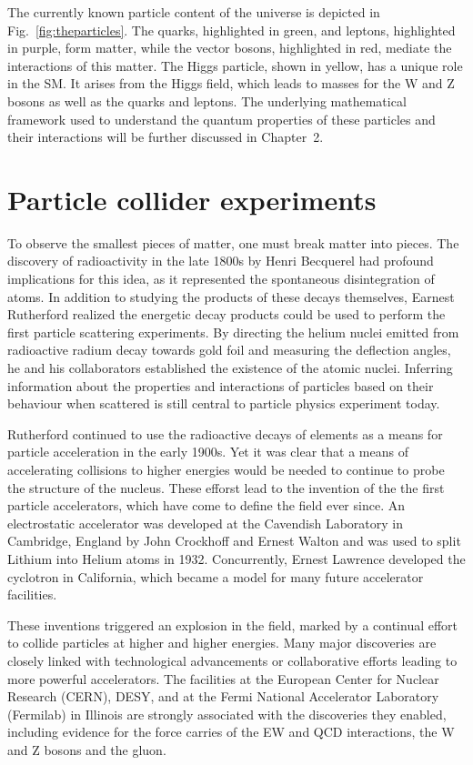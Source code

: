 The currently known particle content of the universe is depicted in Fig.~\ref{fig:theparticles}.
The quarks, highlighted in green, and leptons, highlighted in purple,
form matter, while the vector bosons, highlighted in red, mediate the 
interactions of this matter. The Higgs particle, shown in yellow,
has a unique role in the SM. It arises from the Higgs field, which
leads to masses for the W and Z bosons as well as the quarks and leptons.
The underlying mathematical framework used to understand the quantum 
properties of these particles and their interactions will be further discussed
in Chapter~2. 

\section{Particle collider experiments}

To observe the smallest pieces of matter, one must break matter into pieces.
The discovery of radioactivity in the late 1800s by Henri Becquerel had
profound implications for this idea, as it represented the spontaneous
disintegration of atoms. 
In addition to studying the products of these decays themselves, 
Earnest Rutherford realized the energetic decay products could be used
to perform the first particle scattering experiments. By directing the 
helium nuclei emitted from radioactive radium decay towards gold foil
and measuring the deflection
angles, he and his collaborators established the existence of the atomic nuclei.
Inferring information about the properties and interactions of particles based on their
behaviour when scattered is still central to particle physics experiment today.

Rutherford continued to use the radioactive decays of elements as a means
for particle acceleration in the early 1900s. Yet it was clear that
a means of accelerating collisions to higher energies would be needed
to continue to probe the structure of the nucleus.
These efforst lead to the invention of the 
the first particle accelerators, which have come to define the field ever since.
An electrostatic accelerator was developed at the Cavendish Laboratory
in Cambridge, England by John Crockhoff and Ernest Walton and
was used to split Lithium into Helium atoms in 1932.
Concurrently, Ernest Lawrence developed the cyclotron in California,
which became a model for many future accelerator facilities.

These inventions triggered an explosion in the field, marked by a continual 
effort to collide particles at higher and higher energies. Many major discoveries
are closely linked with technological advancements or collaborative
efforts leading to more powerful accelerators.
The facilities at the European Center for Nuclear
Research (CERN), DESY, and at the 
Fermi National Accelerator Laboratory (Fermilab) in Illinois
are strongly associated with the 
discoveries they enabled, including evidence for the force carries
of the EW and QCD interactions, the W and Z bosons and the gluon.

